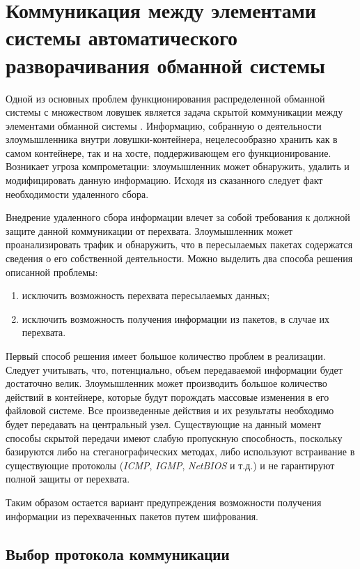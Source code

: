 \section{Коммуникация между элементами системы автоматического разворачивания обманной системы}

Одной из основных проблем функционирования распределенной обманной системы с множеством ловушек является задача скрытой коммуникации между элементами обманной системы \citep{Peskova2014}. Информацию, собранную о деятельности злоумышленника внутри ловушки-контейнера, нецелесообразно хранить как в самом контейнере, так и на хосте, поддерживающем его функционирование. Возникает угроза компрометации: злоумышленник может обнаружить, удалить и модифицировать данную информацию. Исходя из сказанного следует факт необходимости удаленного сбора. 

Внедрение удаленного сбора информации влечет за собой требования к должной защите данной коммуникации от перехвата. Злоумышленник может проанализировать трафик и обнаружить, что в пересылаемых пакетах содержатся сведения о его собственной деятельности. Можно выделить два способа решения описанной проблемы:
\begin{enumerate}
	\item исключить возможность перехвата пересылаемых данных;
	\item исключить возможность получения информации из пакетов, в случае их перехвата.
\end{enumerate}

Первый способ решения имеет большое количество проблем в реализации. Следует учитывать, что, потенциально, объем передаваемой информации будет достаточно велик. Злоумышленник может производить большое количество действий в контейнере, которые будут порождать массовые изменения в его файловой системе. Все произведенные действия и их результаты необходимо будет передавать на центральный узел. Существующие на данный момент способы скрытой передачи имеют слабую пропускную способность, поскольку базируются либо на стеганографических методах, либо используют встраивание в существующие протоколы (\textit{ICMP}, \textit{IGMP}, \textit{NetBIOS} и т.д.) и не гарантируют полной защиты от перехвата.

Таким образом остается вариант предупреждения возможности получения информации из перехваченных пакетов путем шифрования.

\subsection{Выбор протокола коммуникации}

